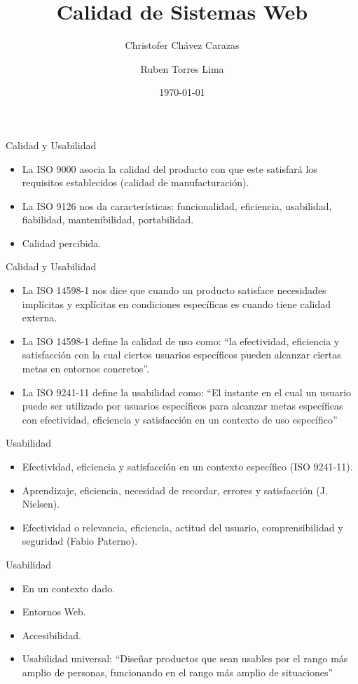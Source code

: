 \documentclass{beamer}
\title{Calidad de Sistemas Web}
\author{Christofer Chávez Carazas \and Ruben Torres Lima}
\institute[Universidad Nacional de San Agustín]
\date{\today}
\begin{document}
\begin{frame}
  \titlepage
\end{frame}

\begin{frame}{Calidad y Usabilidad}
  \begin{itemize}
   \item La ISO 9000 asocia la calidad del producto con que este satisfará los requisitos establecidos (calidad de manufacturación).
   \item La ISO 9126 nos da características: funcionalidad, eficiencia, usabilidad, fiabilidad, mantenibilidad, portabilidad.
   \item Calidad percibida.
  \end{itemize}
\end{frame}

\begin{frame}{Calidad y Usabilidad}
  \begin{itemize}
   \item La ISO 14598-1 nos dice que cuando un producto satisface necesidades implícitas y explícitas en condiciones específicas
   es cuando tiene calidad externa.
   \item La ISO 14598-1 define la calidad de uso como: ``la efectividad, eficiencia y satisfacción con la cual ciertos usuarios específicos pueden alcanzar ciertas metas en entornos
   concretos''.
   \item La ISO 9241-11 define la usabilidad como: ``El instante en el cual un usuario puede ser utilizado por usuarios específicos para alcanzar metas específicas con
   efectividad, eficiencia y satisfacción en un contexto de uso específico''
  \end{itemize}
\end{frame}

\begin{frame}{Usabilidad}
  \begin{itemize}
   \item Efectividad, eficiencia y satisfacción en un contexto específico (ISO 9241-11).
   \item Aprendizaje, eficiencia, necesidad de recordar, errores y satisfacción (J. Nielsen).
   \item Efectividad o relevancia, eficiencia, actitud del usuario, comprensibilidad y seguridad (Fabio Paterno).
  \end{itemize}
\end{frame}

\begin{frame}{Usabilidad}
  \begin{itemize}
   \item En un contexto dado.
   \item Entornos Web.
   \item Accesibilidad.
   \item Usabilidad universal: ``Diseñar productos que sean usables por el rango más amplio de personas, funcionando en el rango más amplio
   de situaciones''
  \end{itemize}
\end{frame}
\end{document}
